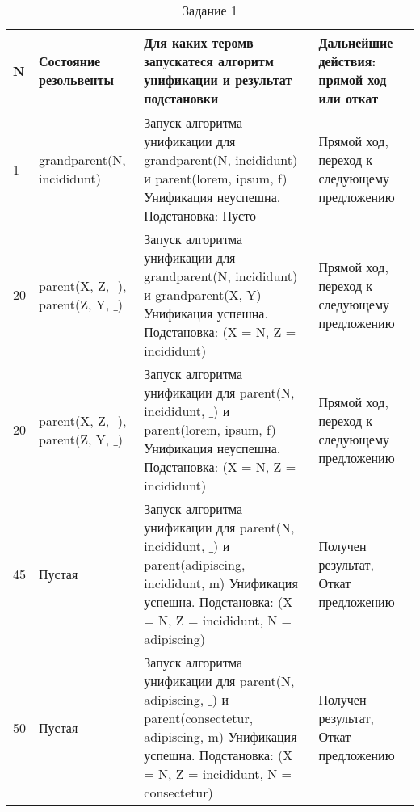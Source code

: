 \begin{table}[ht!]
	\centering
	\caption{Задание 1}
	\label{decisions}
	\begin{tabular}{|p{0.3cm}|p{4cm}|p{7.5cm}|p{4cm}|}
			\hline
			\textbf{N} & \textbf{Состояние резольвенты} & \textbf{Для каких теромв запускатеся алгоритм унификации и результат подстановки} & \textbf{Дальнейшие действия: прямой ход или откат}\\
			
			\hline

			1 & grandparent(N, incididunt)
			& Запуск алгоритма унификации для 
			grandparent(N, incididunt) и parent(lorem, ipsum, f)
			Унификация неуспешна.
			Подстановка: Пусто
			& Прямой ход, переход к следующему
			предложению \\

			\hline

			20 & parent(X, Z, $\_$), parent(Z, Y, $\_$)
			& Запуск алгоритма унификации для 
			grandparent(N, incididunt) и grandparent(X, Y) 
			Унификация успешна.
			Подстановка: (X = N, Z = incididunt)
			& Прямой ход, переход к следующему
			предложению \\

			\hline

			20 & parent(X, Z, $\_$), parent(Z, Y, $\_$)
			& Запуск алгоритма унификации для 
			parent(N, incididunt, $\_$) и parent(lorem, ipsum, f)
			Унификация неуспешна.
			Подстановка: (X = N, Z = incididunt)
			& Прямой ход, переход к следующему
			предложению \\

			\hline

			45 & Пустая
			& Запуск алгоритма унификации для 
			parent(N, incididunt, $\_$) и parent(adipiscing, incididunt, m)
			Унификация успешна.
			Подстановка: (X = N, Z = incididunt, N = adipiscing)
			& Получен результат, Откат
			предложению \\

			\hline

			50 & Пустая
			& Запуск алгоритма унификации для 
			parent(N, adipiscing, $\_$) и parent(consectetur, adipiscing, m)
			Унификация успешна.
			Подстановка: (X = N, Z = incididunt, N = consectetur)
			& Получен результат, Откат
			предложению \\

			\hline
		
	\end{tabular}
\end{table}


